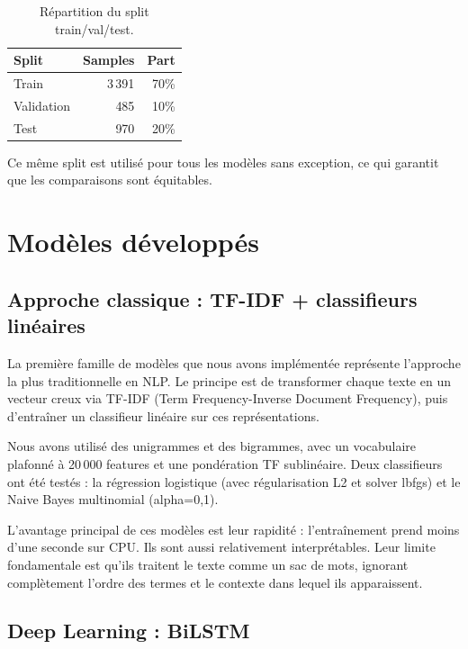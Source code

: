 \documentclass[12pt, a4paper]{article}
\begin{document}
\begin{table}[h]
  \centering
  \begin{tabular}{lrr}
    \toprule
    Split      & Samples & Part \\
    \midrule
    Train      & 3\,391  & 70\% \\
    Validation &    485  & 10\% \\
    Test       &    970  & 20\% \\
    \bottomrule
  \end{tabular}
  \caption{Répartition du split train/val/test.}
\end{table}

Ce même split est utilisé pour tous les modèles sans exception, ce qui garantit
que les comparaisons sont équitables.

\section{Modèles développés}

\subsection{Approche classique : TF-IDF + classifieurs linéaires}

La première famille de modèles que nous avons implémentée représente l'approche
la plus traditionnelle en NLP. Le principe est de transformer chaque texte en un
vecteur creux via TF-IDF (Term Frequency-Inverse Document Frequency), puis
d'entraîner un classifieur linéaire sur ces représentations.

Nous avons utilisé des unigrammes et des bigrammes, avec un vocabulaire plafonné
à 20\,000 features et une pondération TF sublinéaire. Deux classifieurs ont été
testés : la régression logistique (avec régularisation L2 et solver lbfgs) et le
Naive Bayes multinomial (alpha=0,1).

L'avantage principal de ces modèles est leur rapidité : l'entraînement prend moins
d'une seconde sur CPU. Ils sont aussi relativement interprétables. Leur limite
fondamentale est qu'ils traitent le texte comme un sac de mots, ignorant
complètement l'ordre des termes et le contexte dans lequel ils apparaissent.

\subsection{Deep Learning : BiLSTM}
\end{document}

